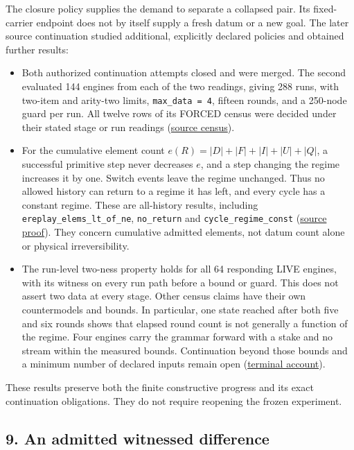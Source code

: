\documentclass[
  11pt,
]{article}
\providecommand{\tightlist}{%
  \setlength{\itemsep}{0pt}\setlength{\parskip}{0pt}}
\begin{document}
The closure policy supplies the demand to separate a collapsed pair. Its
fixed-carrier endpoint does not by itself supply a fresh datum or a new
goal. The later source continuation studied additional, explicitly
declared policies and obtained further results:

\begin{itemize}
\tightlist
\item
  Both authorized continuation attempts closed and were merged. The
  second evaluated 144 engines from each of the two readings, giving 288
  runs, with two-item and arity-two limits, \texttt{max\_data\ =\ 4},
  fifteen rounds, and a 250-node guard per run. All twelve rows of its
  FORCED census were decided under their stated stage or run readings
  (\href{docs/sources/continuation.txt\#L466}{source census}).
\item
  For the cumulative element count \(e(R)=|D|+|F|+|I|+|U|+|Q|\), a
  successful primitive step never decreases \(e\), and a step changing
  the regime increases it by one. Switch events leave the regime
  unchanged. Thus no allowed history can return to a regime it has left,
  and every cycle has a constant regime. These are all-history results,
  including \nolinkurl{ereplay_elems_lt_of_ne}, \nolinkurl{no_return} and
  \nolinkurl{cycle_regime_const}
  (\href{lean4/SecondRun/Run.lean\#L42}{source proof}). They concern
  cumulative admitted elements, not datum count alone or physical
  irreversibility.
\item
  The run-level two-ness property holds for all 64 responding LIVE
  engines, with its witness on every run path before a bound or guard.
  This does not assert two data at every stage. Other census claims have
  their own countermodels and bounds. In particular, one state reached
  after both five and six rounds shows that elapsed round count is not
  generally a function of the regime. Four engines carry the grammar
  forward with a stake and no stream within the measured bounds.
  Continuation beyond those bounds and a minimum number of declared
  inputs remain open
  (\href{docs/sources/continuation.txt\#L792}{terminal account}).
\end{itemize}

These results preserve both the finite constructive progress and its
exact continuation obligations. They do not require reopening the frozen
experiment.

\subsection{9. An admitted witnessed
difference}\label{an-admitted-witnessed-difference}
\end{document}
